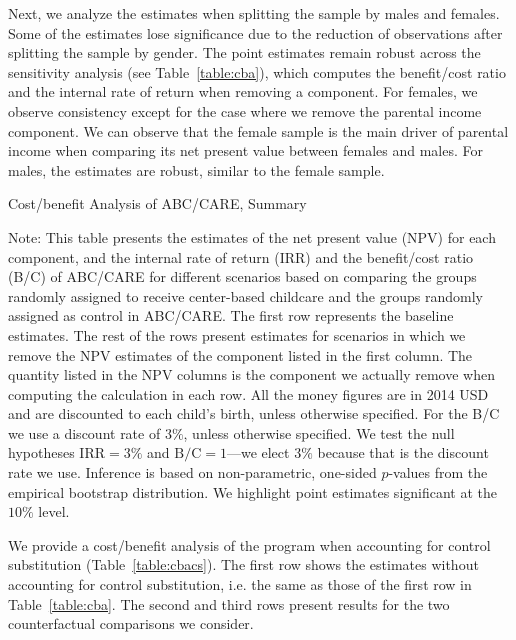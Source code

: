 Next, we analyze the estimates when splitting the sample by males and females. Some of the estimates lose significance due to the reduction of observations after splitting the sample by gender. The point estimates remain robust across  the sensitivity analysis (see Table~\ref{table:cba}), which computes the benefit/cost ratio and the internal rate of return when removing a component. For females, we observe consistency except for the case where we remove the parental income component. We can observe that the female sample is the main driver of parental income when comparing its net present value between females and males. For males, the estimates are robust, similar to the female sample.

\begin{table}[!htbp]
\centering
\caption{Cost/benefit Analysis of ABC/CARE, Summary}\label{table:cba}
\begin{adjustbox}{max width=\textwidth}
\begin{threeparttable}

\begin{tablenotes}
\footnotesize
\item Note: This table presents the estimates of the net present value (NPV) for each component, and the internal rate of return (IRR) and the benefit/cost ratio (B/C) of ABC/CARE for different scenarios based on comparing the groups randomly assigned to receive center-based childcare and the groups randomly assigned as control in ABC/CARE. The first row represents the baseline estimates. The rest of the rows present estimates for scenarios in which we remove the NPV estimates of the component listed in the first column. The quantity listed in the NPV columns is the component we actually remove when computing the calculation in each row. All the money figures are in 2014 USD and are discounted to each child's birth, unless otherwise specified. For the B/C we use a discount rate of $3\%$, unless otherwise specified. We test the null hypotheses $\text{IRR} = 3\%$ and $\text{B/C} = 1$---we elect $3\%$ because that is the discount rate we use. Inference is based on non-parametric, one-sided $p$-values from the empirical bootstrap distribution. We highlight point estimates significant at the $10\%$ level.
\end{tablenotes}
\end{threeparttable}
\end{adjustbox}
\end{table}

We provide a cost/benefit analysis of the program when accounting for control substitution (Table~\ref{table:cbacs}). The first row shows the estimates without accounting for control substitution, i.e. the same as those of the first row in Table~\ref{table:cba}. The second and third rows present results for the two counterfactual comparisons we consider.

